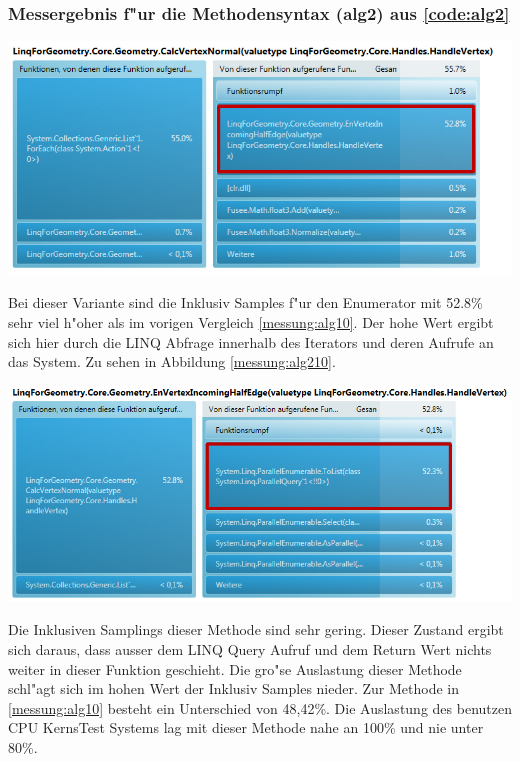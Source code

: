 \documentclass[pagesize, paper=a4, fontsize=12pt,titlepage=true, headings=small, headnosepline, abstractoff, liststotoc, nochapterprefix, plainheadsepline]{scrreprt}
\begin{document}
\subsubsection{Messergebnis f"ur die Methodensyntax (alg2) aus \ref{code:alg2}}
\begin{minipage}[c][8cm]{\linewidth}
\includegraphics[width=\linewidth]{../Messung/2-linq-calcvertnormals-1}
\label{messung:alg20}
\end{minipage}
Bei dieser Variante sind die Inklusiv Samples f"ur den Enumerator mit 52.8\% sehr viel h"oher als im vorigen Vergleich \ref{messung:alg10}. Der hohe Wert ergibt sich hier durch die LINQ Abfrage innerhalb des Iterators und deren Aufrufe an das System. Zu sehen in Abbildung \ref{messung:alg210}.

\begin{minipage}[c][8.5cm]{\linewidth}
\includegraphics[width=\linewidth]{../Messung/2-linq-envertexinche-1-0}
\label{messung:alg210}
\end{minipage}
Die Inklusiven Samplings dieser Methode sind sehr gering. Dieser Zustand ergibt sich daraus, dass ausser dem LINQ Query Aufruf und dem Return Wert nichts weiter in dieser Funktion geschieht. Die gro"se Auslastung dieser Methode schl"agt sich im hohen Wert der Inklusiv Samples nieder. Zur Methode in \ref{messung:alg10} besteht ein Unterschied von 48,42\%. Die Auslastung des benutzen CPU KernsTest Systems lag mit dieser Methode nahe an 100\% und nie unter 80\%.
\end{document}
